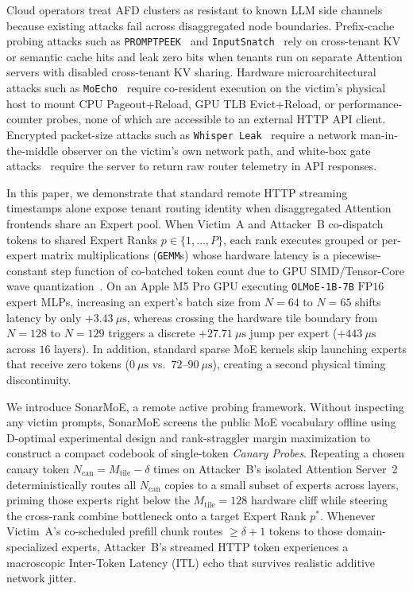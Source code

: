 \documentclass[10pt,journal,compsoc]{IEEEtran}
\def\SM{SonarMoE}%
\theoremstyle{definition}
\theoremstyle{remark}
\newcommand{\SM}{\textsc{SonarMoE}}
\begin{document}
Cloud operators treat AFD clusters as resistant to known LLM side channels because existing attacks fail across disaggregated node boundaries. Prefix-cache probing attacks such as \texttt{PROMPTPEEK}~\cite{wu2025promptpeek} and \texttt{InputSnatch}~\cite{zheng2025inputsnatch} rely on cross-tenant KV or semantic cache hits and leak zero bits when tenants run on separate Attention servers with disabled cross-tenant KV sharing. Hardware microarchitectural attacks such as \texttt{MoEcho}~\cite{ding2025moecho} require co-resident execution on the victim's physical host to mount CPU Pageout+Reload, GPU TLB Evict+Reload, or performance-counter probes, none of which are accessible to an external HTTP API client. Encrypted packet-size attacks such as \texttt{Whisper Leak}~\cite{microsoft2025whisperleak} require a network man-in-the-middle observer on the victim's own network path, and white-box gate attacks~\cite{patel2026routingmembership} require the server to return raw router telemetry in API responses.

In this paper, we demonstrate that standard remote HTTP streaming timestamps alone expose tenant routing identity when disaggregated Attention frontends share an Expert pool. When Victim~A and Attacker~B co-dispatch tokens to shared Expert Ranks $p \in \{1, \dots, P\}$, each rank executes grouped or per-expert matrix multiplications (\texttt{GEMM}s) whose hardware latency is a piecewise-constant step function of co-batched token count due to GPU SIMD/Tensor-Core wave quantization~\cite{gale2023megablocks,tan2025gpugemmcliff}. On an Apple M5 Pro GPU executing \texttt{OLMoE-1B-7B} $\mathrm{FP16}$ expert MLPs, increasing an expert's batch size from $N=64$ to $N=65$ shifts latency by only $+3.43~\mu\mathrm{s}$, whereas crossing the hardware tile boundary from $N=128$ to $N=129$ triggers a discrete $+27.71~\mu\mathrm{s}$ jump per expert ($+443~\mu\mathrm{s}$ across $16$ layers). In addition, standard sparse MoE kernels skip launching experts that receive zero tokens ($0~\mu\mathrm{s}$ vs.\ $72$--$90~\mu\mathrm{s}$), creating a second physical timing discontinuity.

We introduce \SM{}, a remote active probing framework. Without inspecting any victim prompts, \SM{} screens the public MoE vocabulary offline using D-optimal experimental design and rank-straggler margin maximization to construct a compact codebook of single-token \emph{Canary Probes}. Repeating a chosen canary token $N_{\mathrm{can}} = M_{\mathrm{tile}} - \delta$ times on Attacker~B's isolated Attention Server~2 deterministically routes all $N_{\mathrm{can}}$ copies to a small subset of experts across layers, priming those experts right below the $M_{\mathrm{tile}} = 128$ hardware cliff while steering the cross-rank combine bottleneck onto a target Expert Rank $p^*$. Whenever Victim~A's co-scheduled prefill chunk routes $\ge \delta + 1$ tokens to those domain-specialized experts, Attacker~B's streamed HTTP token experiences a macroscopic Inter-Token Latency ($\mathrm{ITL}$) echo that survives realistic additive network jitter.
\end{document}
